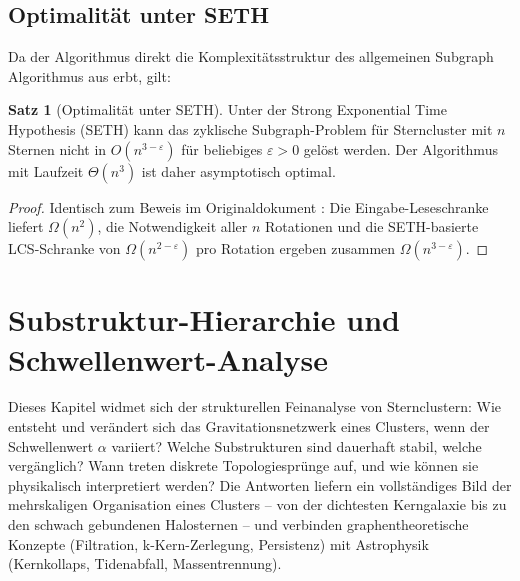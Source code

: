 ﻿\documentclass[a4paper,12pt]{report}
\theoremstyle{definition}
\newtheorem{satz}{Satz}
\begin{document}
\section{Optimalität unter SETH}

Da der Algorithmus direkt die Komplexitätsstruktur des allgemeinen Subgraph Algorithmus aus \cite{epp2026} erbt, gilt:

\begin{satz}[Optimalität unter SETH]
Unter der Strong Exponential Time Hypothesis (SETH) kann das zyklische Subgraph-Problem für Sterncluster mit $n$ Sternen nicht in $O(n^{3-\varepsilon})$ für beliebiges $\varepsilon > 0$ gelöst werden. Der Algorithmus mit Laufzeit $\Theta(n^3)$ ist daher asymptotisch optimal.
\end{satz}

\begin{proof}
Identisch zum Beweis im Originaldokument \cite{epp2026}: Die Eingabe-Leseschranke liefert $\Omega(n^2)$, die Notwendigkeit aller $n$ Rotationen und die SETH-basierte LCS-Schranke von $\Omega(n^{2-\varepsilon})$ pro Rotation ergeben zusammen $\Omega(n^{3-\varepsilon})$.
\end{proof}

\chapter{Substruktur-Hierarchie und Schwellenwert-Analyse}
\label{chap:hierarchie}

Dieses Kapitel widmet sich der strukturellen Feinanalyse von Sternclustern: Wie entsteht und verändert sich das Gravitationsnetzwerk eines Clusters, wenn der Schwellenwert $\alpha$ variiert? Welche Substrukturen sind dauerhaft stabil, welche vergänglich? Wann treten diskrete Topologiesprünge auf, und wie können sie physikalisch interpretiert werden? Die Antworten liefern ein vollständiges Bild der mehrskaligen Organisation eines Clusters -- von der dichtesten Kerngalaxie bis zu den schwach gebundenen Halosternen -- und verbinden graphentheoretische Konzepte (Filtration, k-Kern-Zerlegung, Persistenz) mit Astrophysik (Kernkollaps, Tidenabfall, Massentrennung).
\end{document}
